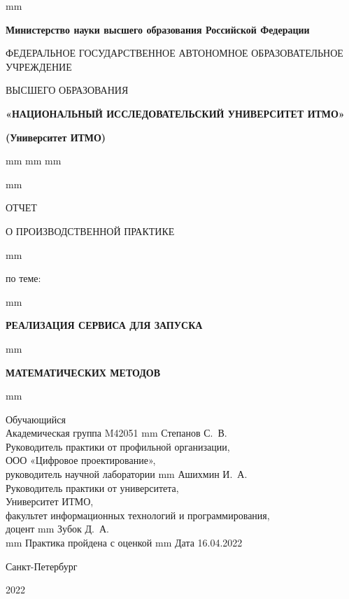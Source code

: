 \thispagestyle{empty}
 mm
\centerline{\footnotesize{\textbf{Министерство науки высшего образования Российской Федерации}}}
\centerline{\footnotesize{ФЕДЕРАЛЬНОЕ ГОСУДАРСТВЕННОЕ АВТОНОМНОЕ ОБРАЗОВАТЕЛЬНОЕ УЧРЕЖДЕНИЕ}}
\centerline{\small{ВЫСШЕГО ОБРАЗОВАНИЯ}}
\centerline{\textbf{«НАЦИОНАЛЬНЫЙ ИССЛЕДОВАТЕЛЬСКИЙ УНИВЕРСИТЕТ ИТМО»}}
\centerline{\textbf{(Университет ИТМО)}}
 mm
 mm
 mm



 mm
\centerline{\LARGE{ОТЧЕТ}}
\centerline{\LARGE{О ПРОИЗВОДСТВЕННОЙ ПРАКТИКЕ}}
 mm
\centerline{\large{по теме:}}
 mm
\centerline{\large\textbf{РЕАЛИЗАЦИЯ СЕРВИСА ДЛЯ ЗАПУСКА}}
 mm
\centerline{\large\textbf{МАТЕМАТИЧЕСКИХ МЕТОДОВ}}

 mm

\noindent Обучающийся \\
Академическая группа M42051  mm Степанов С.~В.\\

\noindent Руководитель практики от профильной организации, \\
ООО «Цифровое проектирование», \\
руководитель научной лаборатории  mm Ашихмин И.~А.\\

\noindent Руководитель практики от университета, \\
Университет ИТМО, \\
факультет информационных технологий и программирования, \\
доцент  mm Зубок Д.~А.\\

 mm
\hfill {Практика пройдена с оценкой \makebox[10mm]{\hrulefill} }
 mm
\hfill Дата 16.04.2022

\vfill \hfil \break
\centerline{\large Санкт-Петербург } \centerline{ 2022 }


